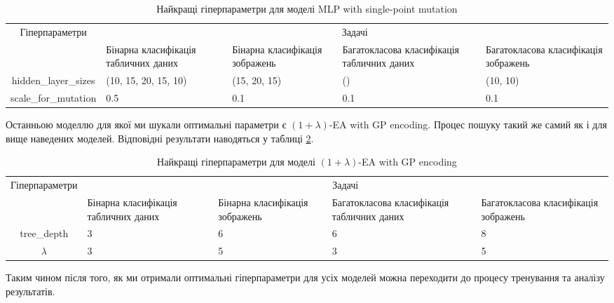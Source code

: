 \begin{table}[ht]
	\centering
	\begin{adjustbox}{max width=\textwidth}
		\begin{tabular}{|c|p{3cm}|p{3cm}|p{3cm}|p{3cm}|}
			\hline \multirow{2}{*}{Гіперпараметри} & \multicolumn{4}{c|}{Задачі} \\
			\cline{2-5} & Бінарна класифікація табличних даних & Бінарна класифікація зображень & Багатокласова класифікація табличних даних & Багатокласова класифікація зображень \\
			\hline hidden\_layer\_sizes & (10, 15, 20, 15, 10) & (15, 20, 15) & () & (10, 10) \\
			\hline scale\_for\_mutation & 0.5 & 0.1 & 0.1 & 0.1 \\
			\hline
		\end{tabular}
	\end{adjustbox}
	\caption{Найкращі гіперпараметри для моделі MLP with single-point mutation}
	\label{tab_hyperparameters_for_mlp_with_sp_mut}
\end{table}

Останньою моделлю для якої ми шукали оптимальні параметри є $(1+\lambda)$-EA with GP encoding. Процес пошуку такий же самий як і для вище наведених моделей. Відповідні результати наводяться у таблиці \ref{tab_hyperparameters_for_evol_alg}.

\begin{table}[ht]
	\centering
	\begin{adjustbox}{max width=\textwidth}
		\begin{tabular}{|c|p{3cm}|p{3cm}|p{3cm}|p{3cm}|}
			\hline \multirow{2}{*}{Гіперпараметри} & \multicolumn{4}{c|}{Задачі} \\
			\cline{2-5} & Бінарна класифікація табличних даних & Бінарна класифікація зображень & Багатокласова класифікація табличних даних & Багатокласова класифікація зображень \\
			\hline tree\_depth & 3 & 6 & 6 & 8 \\
			\hline $\lambda$ & 3 & 5 & 3 & 5 \\
			\hline
		\end{tabular}
	\end{adjustbox}
	\caption{Найкращі гіперпараметри для моделі $(1+\lambda)$-EA with GP encoding}
	\label{tab_hyperparameters_for_evol_alg}
\end{table}

Таким чином після того, як ми отримали оптимальні гіперпараметри для усіх моделей можна переходити до процесу тренування та аналізу результатів.

